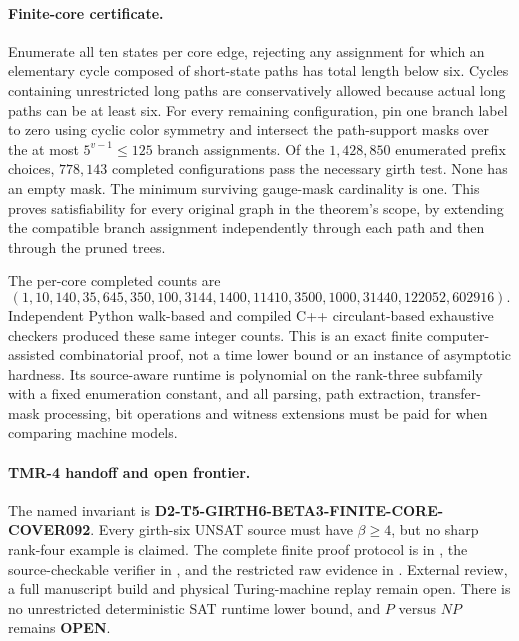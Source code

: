 \documentclass[11pt]{article}
\begin{document}
\paragraph{Finite-core certificate.}
Enumerate all ten states per core edge, rejecting any
assignment for which an elementary cycle composed of
short-state paths has total length below six. Cycles
containing unrestricted long paths are conservatively
allowed because actual long paths can be at least six.
For every remaining configuration, pin one branch label
to zero using cyclic color symmetry and intersect the
path-support masks over the at most $5^{v-1}\leq125$
branch assignments. Of the $1{,}428{,}850$ enumerated
prefix choices, $778{,}143$ completed configurations
pass the necessary girth test. None has an empty mask.
The minimum surviving gauge-mask cardinality is one.
This proves satisfiability for every original graph
in the theorem's scope, by extending the compatible
branch assignment independently through each path
and then through the pruned trees.

The per-core completed counts are
\[
(1,10,140,35,645,350,100,3144,1400,11410,
3500,1000,31440,122052,602916).
\]
Independent Python walk-based and compiled C++
circulant-based exhaustive checkers produced these
same integer counts. This is an exact finite
computer-assisted combinatorial proof, not a time
lower bound or an instance of asymptotic hardness.
Its source-aware runtime is polynomial on the
rank-three subfamily with a fixed enumeration constant,
and all parsing, path extraction, transfer-mask
processing, bit operations and witness extensions must
be paid for when comparing machine models.

\paragraph{TMR-4 handoff and open frontier.}
The named invariant is
\textbf{D2-T5-GIRTH6-BETA3-FINITE-CORE-COVER092}.
Every girth-six UNSAT source must have
$\beta\geq4$, but no sharp rank-four example
is claimed. The complete finite proof protocol is in
,
the source-checkable verifier in
,
and the restricted raw evidence in
.
External review, a full manuscript build and physical
Turing-machine replay remain open. There is no
unrestricted deterministic SAT runtime lower bound,
and $P$ versus $NP$ remains \textbf{OPEN}.
\end{document}
